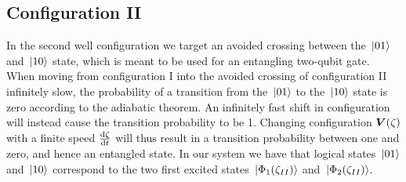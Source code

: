 \documentclass[twocolumn,superscriptaddress,unsortedaddress,
 amsmath,amssymb,
 aps,
]{revtex4-2}
\begin{document}
    \subsection{Configuration II}
        In the second well configuration we target an avoided crossing between the $\ket*{01}$ and
        $\ket*{10}$ state, which is meant to be used for an entangling two-qubit gate. When moving from configuration I into the avoided crossing of configuration II infinitely slow, the probability of a transition from the $\ket*{01}$ to the $\ket*{10}$ state is zero according to the adiabatic theorem. An infinitely fast shift in configuration will instead cause the transition probability to be 1. Changing configuration $\vb*{V}(\zeta)$ with a finite speed $\dv{\zeta}{t}$ will thus result in a transition probability between one and zero, and hence an entangled state. %
        In our system we have that logical states $\ket*{01}$ and $\ket*{10}$ correspond
        to the two first excited states $\ket*{\Phi_1(\zeta_{II})}$ and
        $\ket*{\Phi_2(\zeta_{II})}$.
        
\end{document}
